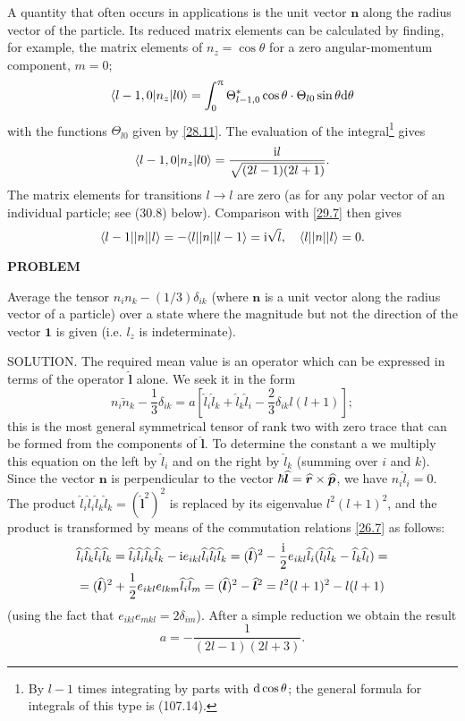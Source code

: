 A quantity that often occurs in applications is the unit vector $ \bm{n} $ along the radius vector of the particle. Its reduced matrix elements can be calculated by finding, for example, the matrix elements of $ n_z = \cos\theta $ for a zero angular-momentum component, $ m = 0 $;
\[ \langle l-1,0|n_z|l0\rangle=\int_{0}^{\uppi}\Theta_{l-1,0}^*\cos\theta\cdot\Theta_{l0}\sin\theta\mathrm{d}\theta \]
with the functions $\Theta_{l0}$ given by \eqref{28.11}. The evaluation of the integral\footnote{By $ l-1 $ times integrating by parts with $ \mathrm{d} \cos\theta $; the general formula for integrals of this type is (107.14).} gives
\[ \langle l-1,0|n_z|l0\rangle=\frac{\mathrm{i} l}{\sqrt{(2l-1)(2l+1)}}. \]
The matrix elements for transitions $ l \to l $ are zero (as for any polar vector of an individual particle; see (30.8) below). Comparison with \eqref{29.7} then gives
\begin{equation}\label{29.14}
\langle l-1||n||l\rangle=-\langle l||n||l-1\rangle=\mathrm{i}\sqrt{l},\quad\langle l||n||l\rangle=0.
\end{equation}






{\small
\textbf{PROBLEM}


Average the tensor $ n_in_k-(1/3)\delta_{ik} $ (where $ \bm{n} $ is a unit vector along the radius vector of a particle) over a state where the magnitude but not the direction of the vector $ \bm{1} $ is given (i.e. $ l_z $ is indeterminate).





SOLUTION. The required mean value is an operator which can be expressed in terms of the operator $\hat{\bm{l}}$ alone. We seek it in the form
\[ \bar{n_in_k}-\frac{1}{3}\delta_{ik}=a\left[\hat{l}_i\hat{l}_k+\hat{l}_k\hat{l}_i-\frac{2}{3}\delta_{ik}l(l+1) \right]; \]
this is the most general symmetrical tensor of rank two with zero trace that can be formed from the components of $\hat{\bm{l}}$. To determine the constant a we multiply this equation on the left by $ \hat{l}_i $ and on the right by $\hat{l}_k$ (summing over $ i $ and $ k $). Since the vector $ \bm{n} $ is perpendicular to the vector $ \hbar\widehat{\bm{l}}=\widehat{\bm{r}
}\times\widehat{\bm{p}} $, we have $ n_i\hat{l}_i=0 $. The product $ \hat{l}_i\hat{l}_i\hat{l}_k\hat{l}_k=(\hat{\bm{l}}^2)^2 $ is replaced by its eigenvalue $ l^2(l + 1)^2 $, and the product is transformed by means of the commutation relations \eqref{26.7} as follows:
\begin{multline*}
\widehat{l}_i\widehat{l}_k\widehat{l}_i\widehat{l}_k=\widehat{l}_i\widehat{l}_i\widehat{l}_k\widehat{l}_k-\mathrm{i} e_{ikl}\widehat{l}_i\widehat{l}_l\widehat{l}_k=(\widehat{\bm{l}})^2-\frac{\mathrm{i}}{2}e_{ikl}\widehat{l}_i(\widehat{l}_l\widehat{l}_k-\widehat{l}_k\widehat{l}_l)=\\
=(\widehat{\bm{l}})^2+\frac{1}{2}e_{ikl}e_{lkm}\widehat{l}_i\widehat{l}_m=(\widehat{\bm{l}})^2-\widehat{\bm{l}}^2=l^2(l+1)^2-l(l+1)
\end{multline*}
(using the fact that $ e_{ikl}e_{mkl} = 2\delta_{im} $). After a simple reduction we obtain the result
\[ a=-\frac{1}{(2l-1)(2l+3)}. \]}





